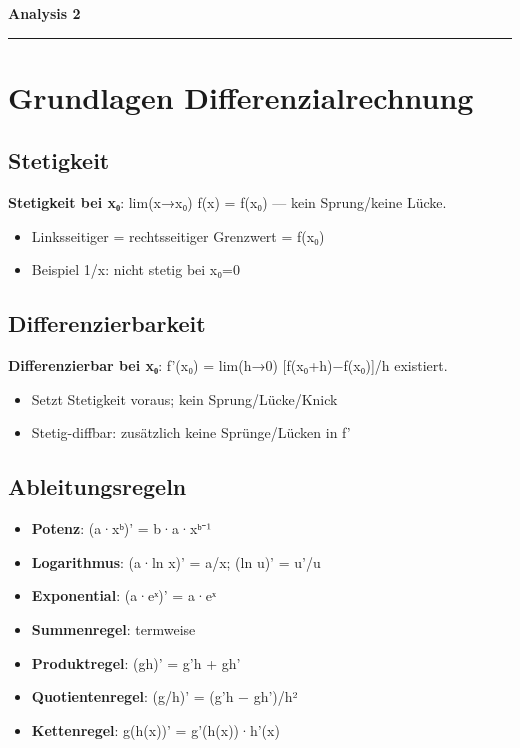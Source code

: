 \documentclass[11pt, a4paper]{article}
\providecommand{\nichttitle}{Lernzettel}
\renewcommand{\nichttitle}{Analysis 2}
\begin{document}
\begin{center}
{\bfseries\Large\color{accent}\nichttitle}\\[2pt]
\color{accent}\rule{0.35\linewidth}{1pt}\color{black}
\end{center}
\vspace{2pt}

{\small\tableofcontents}
\newpage


\section{Grundlagen Differenzialrechnung}


\subsection{Stetigkeit}
\textbf{Stetigkeit bei x₀}: lim(x→x₀) f(x) = f(x₀) — kein Sprung/keine Lücke.

\begin{itemize}
  \item Linksseitiger = rechtsseitiger Grenzwert = f(x₀)
  \item Beispiel 1/x: nicht stetig bei x₀=0
\end{itemize}


\subsection{Differenzierbarkeit}
\textbf{Differenzierbar bei x₀}: f'(x₀) = lim(h→0) [f(x₀+h)−f(x₀)]/h existiert.

\begin{itemize}
  \item Setzt Stetigkeit voraus; kein Sprung/Lücke/Knick
  \item Stetig-diffbar: zusätzlich keine Sprünge/Lücken in f'
\end{itemize}


\subsection{Ableitungsregeln}
\begin{itemize}
  \item \textbf{Potenz}: (a·xᵇ)' = b·a·xᵇ⁻¹
  \item \textbf{Logarithmus}: (a·ln x)' = a/x; (ln u)' = u'/u
  \item \textbf{Exponential}: (a·eˣ)' = a·eˣ
  \item \textbf{Summenregel}: termweise
  \item \textbf{Produktregel}: (gh)' = g'h + gh'
  \item \textbf{Quotientenregel}: (g/h)' = (g'h − gh')/h²
  \item \textbf{Kettenregel}: g(h(x))' = g'(h(x))·h'(x)
\end{itemize}
\end{document}
